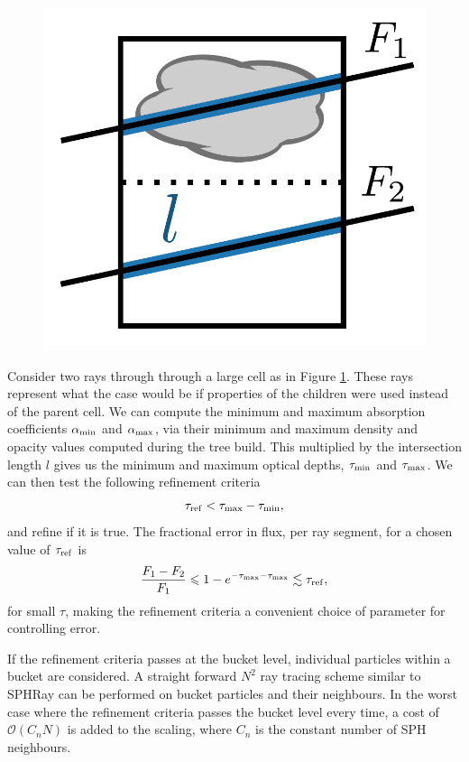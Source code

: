 \documentclass[fleq,usenatbib]{mnras}
\newcommand{\bigO}[1]{\mathcal{O}\left(#1\right)}
\newcommand{\tr}{\tau_{\rm ref}}
\begin{document}
\begin{figure}
\includegraphics[width=1\linewidth]{Figures/refine.pdf}
\caption{}
\label{fig:refine}
\end{figure}
Consider two rays through through a large cell as in Figure \ref{fig:refine}. 
These rays represent what the case would be if properties of the children were 
used instead of the parent cell. We can compute the minimum and maximum 
absorption coefficients $\alpha_{\rm min}$ and $\alpha_{\rm max}$, via their 
minimum and maximum density and opacity values computed during the tree build. 
This multiplied by the intersection length $l$ gives us the minimum and 
maximum optical depths, $\tau_{\rm min}$ and $\tau_{\rm max}$. We can then 
test the following refinement criteria
\begin{equation}
\label{eqn:refcrit}
\tr < \tau_{\rm max} - \tau_{\rm min},
\end{equation}
and refine if it is true. The fractional error in flux, per ray segment, for a 
chosen value of $\tr$ is
\begin{equation}
\label{eqn:reffrac}
\frac{F_1 - F_2}{F_1} \leq 1 - e^{-\tau_{\rm max}-\tau_{\rm max}} 
\lesssim \tr,
\end{equation}
for small $\tau$, making the refinement criteria a convenient choice of 
parameter for controlling error.

If the refinement criteria passes at the bucket level, individual particles 
within a bucket are considered. A straight forward $N^2$ ray tracing scheme 
similar to SPHRay \citep{altayEt08} can be performed on bucket particles and 
their neighbours. In the worst case where the refinement criteria passes the 
bucket level every time, a cost of $\bigO{C_n N}$ is added to the scaling, 
where $C_n$ is the constant number of SPH neighbours.
\end{document}
